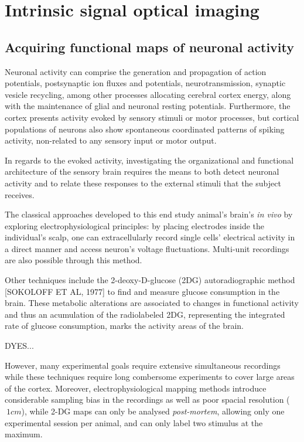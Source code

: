 \section{Intrinsic signal optical imaging}
\label{sec:sectiona}

\subsection{Acquiring functional maps of neuronal activity}

Neuronal activity can comprise the generation and propagation of action potentials, postsynaptic ion fluxes and potentials, neurotransmission, synaptic vesicle recycling, among other processes allocating cerebral cortex energy, along with the maintenance of glial and neuronal resting potentials. Furthermore, the cortex presents activity evoked by sensory stimuli or motor processes, but cortical populations of neurons also show spontaneous coordinated patterns of spiking activity, non-related to any sensory input or motor output.

In regards to the evoked activity, investigating the organizational and functional architecture of the sensory brain requires the means to both detect neuronal activity and to relate these responses to the external stimuli that the subject receives.  

 

The classical approaches developed to this end study animal's brain's \textit{in vivo} by exploring electrophysiological principles: by placing electrodes inside the individual's scalp, one can extracellularly record single cells' electrical activity in a direct manner and access neuron's voltage fluctuations. Multi-unit recordings are also possible through this method. 

Other techniques include the 2-deoxy-D-glucose (2DG) autoradiographic method [SOKOLOFF ET AL, 1977] to find and measure glucose consumption in the brain. These metabolic alterations are associated to changes in functional activity and thus an acumulation of the radiolabeled 2DG, representing the integrated rate of glucose consumption, marks the activity areas of the brain.

DYES...

However, many experimental goals require extensive simultaneous recordings while these techniques require  long combersome experiments to cover large areas of the cortex. Moreover, electrophysiological mapping methods introduce considerable sampling bias in the recordings as well as poor spacial resolution ($~1 cm$), while 2-DG maps can only be analysed \textit{post-mortem}, allowing only one experimental session per animal, and can only label two stimulus at the maximum.

